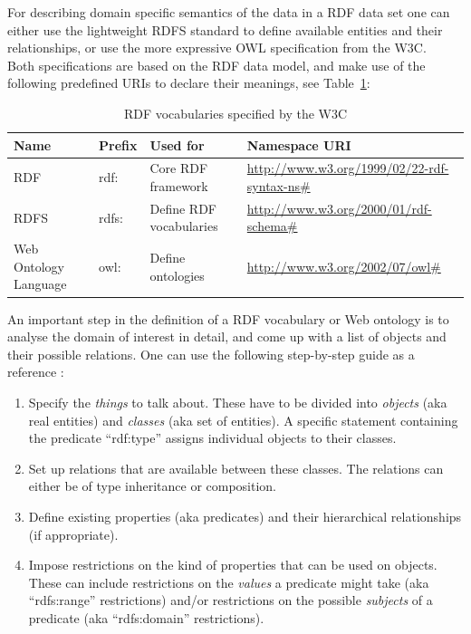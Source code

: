 For describing domain specific semantics of the data in a \gls{RDF} data set one can either use the lightweight \gls{RDFS} standard to define available entities and their relationships, or use the more expressive \gls{OWL} specification from the \gls{W3C}. \\

Both specifications are based on the \gls{RDF} data model, and make use of the following predefined \gls{URI}s to declare their meanings, see Table~\ref{tab:w3c_vocab_rdf}: \@

\begin{table}[H]
\centering
\begin{tabular}{p{3cm}llp{4.5cm}}
\hline
\textbf{Name} & \textbf{Prefix} & \textbf{Used for} & \textbf{Namespace URI} \\
\hline
\gls{RDF} & rdf: & Core \gls{RDF} framework & \url{http://www.w3.org/1999/02/22-rdf-syntax-ns\#} \\
\hline
\gls{RDFS} & rdfs: & Define \gls{RDF} vocabularies & \url{http://www.w3.org/2000/01/rdf-schema\#} \\
\hline
Web Ontology Language & owl: & Define ontologies & \url{http://www.w3.org/2002/07/owl\#} \\
\hline
\end{tabular}
\caption[\gls{RDF} vocabularies specified by the \gls{W3C}]{\gls{RDF} vocabularies specified by the \gls{W3C} \citep[pg. 41]{wood2014linked}}
\label{tab:w3c_vocab_rdf}
\end{table}

An important step in the definition of a \gls{RDF} vocabulary or Web ontology is to analyse the domain of interest in detail, and come up with a list of objects and their possible relations. One can use the following step-by-step guide as a reference \citep[pg. 40-55]{antoniou2012semantic}: \@

\begin{enumerate}
	\item Specify the \emph{things} to talk about. These have to be divided into \emph{objects} (aka real entities) and \emph{classes} (aka set of entities). A specific statement containing the predicate ``rdf:type'' assigns individual objects to their classes.
	\item Set up relations that are available between these classes. The relations can either be of type inheritance or composition.
	\item Define existing properties (aka predicates) and their hierarchical relationships (if appropriate).
	\item Impose restrictions on the kind of properties that can be used on objects. These can include restrictions on the \emph{values} a predicate might take (aka ``rdfs:range'' restrictions) and/or restrictions on the possible \emph{subjects} of a predicate (aka ``rdfs:domain'' restrictions).
\end{enumerate}

